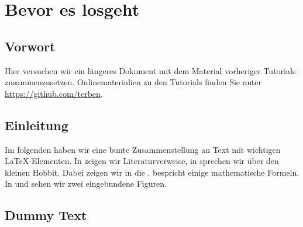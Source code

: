 \chapter{Bevor es losgeht}
%
\section{Vorwort}
Hier versuchen wir ein längeres Dokument mit dem Material vorheriger
Tutorials zusammenzusetzen. Onlinematerialien zu den Tutorials finden Sie
unter \url{https://github.com/terben}.
%
\section{Einleitung}
Im folgenden haben wir eine bunte Zusammenstellung an Text mit
wichtigen \LaTeX{}-Elementen. In  zeigen wir
Literaturverweise, in  sprechen wir über den
kleinen Hobbit. Dabei zeigen wir in
 die . 
bespricht einige mathematische Formeln. In 
und  sehen wir zwei eingebundene Figuren.
%
\section{Dummy Text}
\blindtext
\blindtext
%
